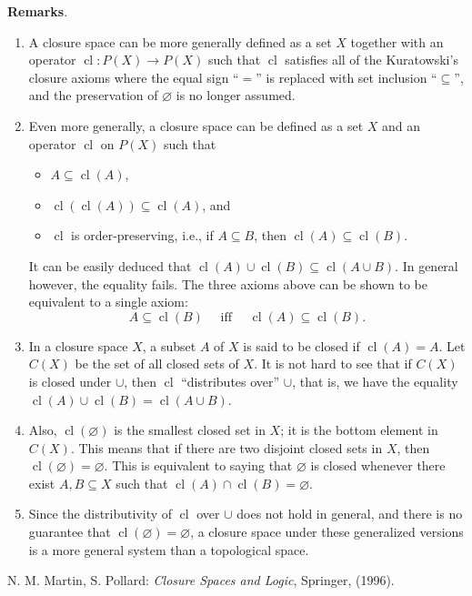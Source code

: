 \documentclass[12pt]{article}
\newcommand{\cl}{\operatorname{cl}}
\begin{document}
\textbf{Remarks}.  
\begin{enumerate}
\item
A closure space can be more generally defined as a set $X$ together with an operator $\cl:P(X)\to P(X)$ such that $\cl$ satisfies all of the Kuratowski's closure axioms where the equal sign ``$=$'' is replaced with set inclusion ``$\subseteq$'', and the preservation of $\varnothing$ is no longer assumed.
\item
Even more generally, a closure space can be defined as a set $X$ and an operator $\cl$ on $P(X)$ such that 
\begin{itemize}
\item $A\subseteq \cl(A)$,
\item $\cl(\cl(A))\subseteq \cl(A)$, and
\item $\cl$ is order-preserving, i.e., if $A\subseteq B$, then $\cl(A)\subseteq \cl(B)$.
\end{itemize}
It can be easily deduced that $\cl(A)\cup \cl(B)\subseteq \cl(A\cup B)$.  In general however, the equality fails.  The three axioms above can be shown to be equivalent to a single axiom:
$$A\subseteq \cl(B)\quad\mbox{ iff }\quad\cl(A)\subseteq \cl(B).$$
\item
In a closure space $X$, a subset $A$ of $X$ is said to be closed if $\cl(A)=A$.  Let $C(X)$ be the set of all closed sets of $X$.  It is not hard to see that if $C(X)$ is closed under $\cup$, then $\cl$ ``distributes over'' $\cup$, that is, we have the equality $\cl(A)\cup \cl(B)= \cl(A\cup B)$.
\item
Also, $\cl(\varnothing)$ is the smallest closed set in $X$; it is the bottom element in $C(X)$.  This means that if there are two disjoint closed sets in $X$, then $\cl(\varnothing)=\varnothing$.  This is equivalent to saying that $\varnothing$ is closed whenever there exist $A,B\subseteq X$ such that $\cl(A)\cap\cl(B)=\varnothing$.
\item
Since the distributivity of $\cl$ over $\cup$ does not hold in general, and there is no guarantee that $\cl(\varnothing)=\varnothing$, a closure space under these generalized versions is a more general system than a topological space.
\end{enumerate}

\begin{thebibliography}{7}
 N. M. Martin, S. Pollard: {\em Closure Spaces and Logic}, Springer, (1996).
\end{thebibliography}
\end{document}

